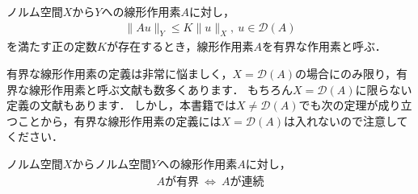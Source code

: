 \begin{defi}[有界な線形作用素]\label{def:bounded_operator}
	ノルム空間$X$から$Y$への線形作用素$A$に対し，
	\begin{align*}
	\| A u \|_{Y} \le K \| u \|_{X}, ~ u \in {\mathcal D}(A)
	\end{align*}
	を満たす正の定数$K$が存在するとき，線形作用素$A$を有界な作用素と呼ぶ．
\end{defi}

有界な線形作用素の定義は非常に悩ましく，$X = {\mathcal D}(A)$の場合にのみ限り，有界な線形作用素と呼ぶ文献も数多くあります．
もちろん$X = {\mathcal D}(A)$に限らない定義の文献もあります．
しかし，本書籍では$X \neq {\mathcal D}(A)$でも次の定理が成り立つことから，有界な線形作用素の定義には$X = {\mathcal D}(A)$は入れないので注意してください．

\begin{Thm}[有界な線形作用素と連続な線形作用素]\label{thm:bounded_continus_operator}
	ノルム空間$X$からノルム空間$Y$への線形作用素$A$に対し，
	\begin{align*}
	A \mbox{が有界} ~ \Leftrightarrow ~ A \mbox{が連続}
	\end{align*}
\end{Thm}

